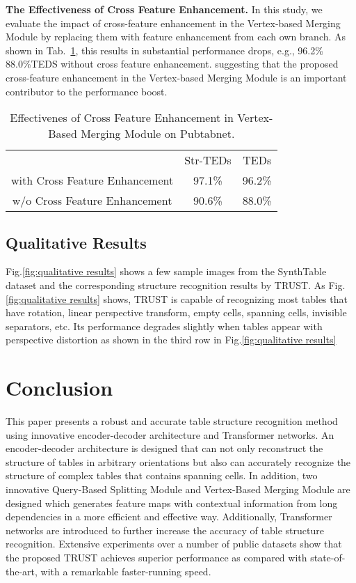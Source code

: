 \documentclass[lettersize,journal]{IEEEtran}
\begin{document}
\textbf{The Effectiveness of Cross Feature Enhancement.} In this study, we evaluate the impact of cross-feature enhancement in the Vertex-based Merging Module by replacing them with feature enhancement from each own branch. As shown in Tab.~\ref{table:CFE}, this results in substantial performance drops, e.g., 96.2\%  88.0\%TEDS without cross feature enhancement. suggesting that the proposed cross-feature enhancement in the Vertex-based Merging Module is an important contributor to the performance boost.

\setlength{\tabcolsep}{4pt}
\begin{table}
\begin{center}
\caption{Effectivenes of Cross Feature Enhancement in Vertex-Based Merging Module on Pubtabnet.}
\label{table:CFE}
\begin{tabular}{c|cc}
\hline\noalign{\smallskip}
 & Str-TEDs  & TEDs\\
\noalign{\smallskip}
\hline
\noalign{\smallskip}
with Cross Feature Enhancement  & 97.1\% &  96.2\% \\
w/o Cross Feature Enhancement  & 90.6\%  &   88.0\%    \\
\hline
\end{tabular}
\end{center}
\end{table}
\setlength{\tabcolsep}{1.4pt}

\subsection{Qualitative Results}  Fig.\ref{fig:qualitative results} shows a few sample images from the SynthTable dataset and the corresponding structure recognition results by TRUST. As Fig.\ref{fig:qualitative results} shows, TRUST is capable of recognizing most tables that have rotation, linear perspective transform, empty cells, spanning cells, invisible separators, etc. Its performance degrades slightly when tables appear with perspective distortion as shown in the third row in Fig.\ref{fig:qualitative results}

\section{Conclusion}
This paper presents a robust and accurate table structure recognition method using innovative encoder-decoder architecture and Transformer networks. An encoder-decoder architecture is designed that can not only reconstruct the structure of tables in arbitrary orientations but also can accurately recognize the structure of complex tables that contains spanning cells. In addition, two innovative Query-Based Splitting Module and Vertex-Based Merging Module are designed which generates feature maps with contextual information from long dependencies in a more efficient and effective way. Additionally, Transformer networks are introduced to further increase the accuracy of table structure recognition. Extensive experiments over a number of public datasets show that the proposed TRUST achieves superior performance as compared with state-of-the-art, with a remarkable faster-running speed.
\end{document}
